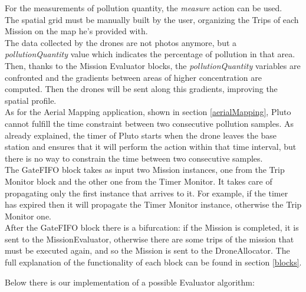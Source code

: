 For the measurements of pollution quantity, the \textit{measure} action can be used.
\\

The spatial grid must be manually built by the user, organizing the Trips of each Mission on the map he's provided with.
\\

The data collected by the drones are not photos anymore, but a \textit{pollutionQuantity} value which indicates the percentage of pollution in that area.
\\

Then, thanks to the Mission Evaluator blocks, the \textit{pollutionQuantity} variables are confronted and the gradients between areas of higher concentration are computed.
Then the drones will be sent along this gradients, improving the spatial profile.
\\

As for the Aerial Mapping application, shown in section \ref{aerialMapping}, Pluto cannot fulfill the time constraint between two consecutive pollution samples.
As already explained, the timer of Pluto starts when the drone leaves the base station and ensures that it will perform the action within that time interval, but there is no way to constrain the time between two consecutive samples.
\\

The GateFIFO block takes as input two Mission instances, one from the Trip Monitor block and the other one from the Timer Monitor.
It takes care of propagating only the first instance that arrives to it.
For example, if the timer has expired then it will propagate the Timer Monitor instance, otherwise the Trip Monitor one.
\\

After the GateFIFO block there is a bifurcation:
if the Mission is completed, it is sent to the MissionEvaluator, otherwise there are some trips of the mission that must be executed again, and so the Mission is sent to the DroneAllocator.
The full explanation of the functionality of each block can be found in section \ref{blocks}.


Below there is our implementation of a possible Evaluator algorithm:
\\

